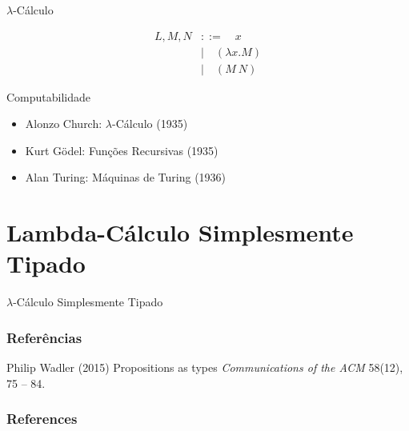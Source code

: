 \documentclass{beamer}
\begin{document}

\begin{frame}{$\lambda$-Cálculo}

\begin{block}{}

\begin{align*}
L, M, N &::=  \quad x \\
        &\mid \quad (\lambda x.M) \\
        &\mid \quad (M ~ N) 
\end{align*}

\end{block}

\end{frame}


\begin{frame}{Computabilidade}

\begin{block}{}

\begin{itemize}
\item Alonzo Church: $\lambda$-Cálculo (1935)
\item Kurt Gödel: Funções Recursivas   (1935)
\item Alan Turing: Máquinas de Turing  (1936)
\end{itemize}

\end{block}

\end{frame}

\section{Lambda-Cálculo Simplesmente Tipado}

\begin{frame}{$\lambda$-Cálculo Simplesmente Tipado}


\end{frame}


\begin{frame}
\frametitle{Referências}
\footnotesize{
\begin{thebibliography}{99}
 Philip Wadler (2015)
\newblock Propositions as types
\newblock \emph{Communications of the ACM} 58(12), 75 -- 84.

\end{thebibliography}
}
\end{frame}

\begin{frame}[t, allowframebreaks]
\frametitle{References}


\end{frame}

\end{document}
